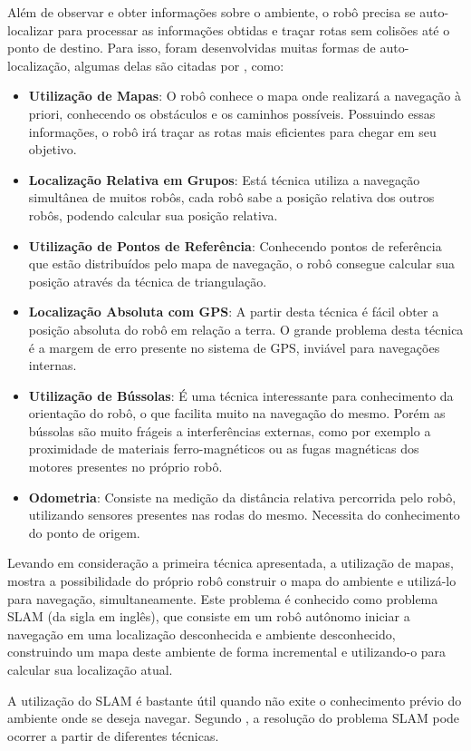 	Além de observar e obter informações sobre o ambiente, o robô precisa se auto-localizar para processar as informações obtidas e traçar rotas sem colisões até o ponto de destino. Para isso, foram desenvolvidas muitas formas de auto-localização, algumas delas são citadas por \cite{roboBulldozerIV}, como:

	\begin{itemize}
		\item \textbf{Utilização de Mapas}: O robô conhece o mapa onde realizará a navegação à priori, conhecendo os obstáculos e os caminhos possíveis. Possuindo essas informações, o robô irá traçar as rotas mais eficientes para chegar em seu objetivo.

		\item \textbf{Localização Relativa em Grupos}: Está técnica utiliza a navegação simultânea de muitos robôs, cada robô sabe a posição relativa dos outros robôs, podendo calcular sua posição relativa.

		\item \textbf{Utilização de Pontos de Referência}: Conhecendo pontos de referência que estão distribuídos pelo mapa de navegação, o robô consegue calcular sua posição através da técnica de triangulação.

		\item \textbf{Localização Absoluta com GPS}: A partir desta técnica é fácil obter a posição absoluta do robô em relação a terra. O grande problema desta técnica é a margem de erro presente no sistema de GPS, inviável para navegações internas.

		\item \textbf{Utilização de Bússolas}: É uma técnica interessante para conhecimento da orientação do robô, o que facilita muito na navegação do mesmo. Porém as bússolas são muito frágeis a interferências externas, como por exemplo a proximidade de materiais ferro-magnéticos ou as fugas magnéticas dos motores presentes no próprio robô.

		\item \textbf{Odometria}: Consiste na medição da distância relativa percorrida pelo robô, utilizando sensores presentes nas rodas do mesmo. Necessita do conhecimento do ponto de origem.
		 
	\end{itemize}

	Levando em consideração a primeira técnica apresentada, a utilização de mapas, \cite{localizacaoEMapeamentoPaulo} mostra a possibilidade do próprio robô construir o mapa do ambiente e utilizá-lo para navegação, simultaneamente. Este problema é conhecido como problema SLAM (da sigla em inglês), que consiste em um robô autônomo iniciar a navegação em uma localização desconhecida e  ambiente desconhecido, construindo um mapa deste ambiente de forma incremental e utilizando-o para calcular sua localização atual.

	A utilização do SLAM é bastante útil quando não exite o conhecimento prévio do ambiente onde se deseja navegar. Segundo \cite{localizacaoEMapeamentoPaulo}, a resolução do problema SLAM pode ocorrer a partir de diferentes técnicas.